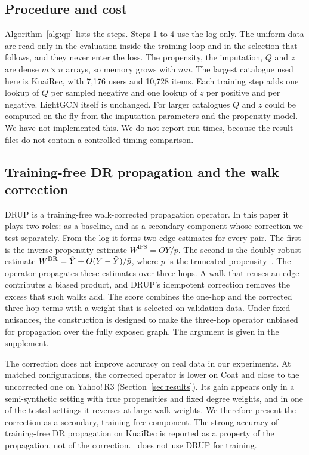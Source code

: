\subsection{Procedure and cost}\label{sec:cost}

Algorithm~\ref{alg:qp} lists the steps. Steps 1 to 4 use the log only. The uniform data are read
only in the evaluation inside the training loop and in the selection that follows, and they never
enter the loss. The propensity, the imputation, $Q$ and $z$ are dense
$m\times n$ arrays, so memory grows with $mn$. The largest catalogue used here is KuaiRec, with
7{,}176 users and 10{,}728 items. Each training step adds one lookup of $Q$ per sampled negative
and one lookup of $z$ per positive and per negative. LightGCN itself is unchanged. For larger
catalogues $Q$ and $z$ could be computed on the fly from the imputation parameters and the
propensity model. We have not implemented this. We do not report run times, because the result
files do not contain a controlled timing comparison.

\subsection{Training-free DR propagation and the walk correction}\label{sec:drup}

DRUP is a training-free walk-corrected propagation operator. In this paper it plays two roles: as a baseline, and as a secondary
component whose correction we test separately. From the log it forms two edge estimates for every
pair. The first is the inverse-propensity estimate $W^{\mathrm{IPS}}=OY/\bar p$. The second is the
doubly robust estimate $W^{\mathrm{DR}}=\hat Y+O(Y-\hat Y)/\bar p$, where $\bar p$ is the truncated
propensity~\citep{dudik2011doubly}. The operator propagates these estimates over three hops. A
walk that reuses an edge contributes a biased product, and DRUP's idempotent correction removes
the excess that such walks add. The score combines the one-hop and the corrected three-hop terms
with a weight that is selected on validation data. Under fixed nuisances, the construction is
designed to make the three-hop operator unbiased for propagation over the fully exposed graph. The
argument is given in the supplement.

The correction does not improve accuracy on real data in our experiments. At matched
configurations, the corrected operator is lower on Coat and close to the uncorrected one on Yahoo!\,R3
(Section~\ref{sec:results}). Its gain appears only in a semi-synthetic setting with true propensities and fixed
degree weights, and in one of the tested settings it reverses at large walk weights. We therefore present the correction
as a secondary, training-free component. The strong accuracy of training-free DR propagation on
KuaiRec is reported as a property of the propagation, not of the correction. \qp\ does not use
DRUP for training.
